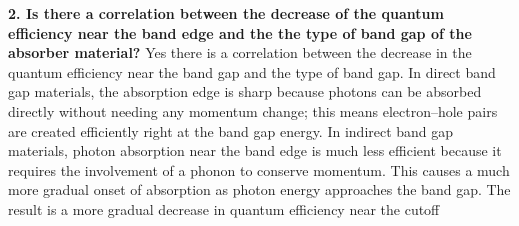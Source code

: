 \textbf{2. Is there a correlation between the decrease of the quantum efficiency near the band edge and the the type of band gap of the absorber material?}
Yes there is a correlation between the decrease in the quantum efficiency near the band gap and the type of band gap.
In direct band gap materials, the absorption edge is sharp because photons can be absorbed directly without needing any momentum change; this means electron–hole pairs are created efficiently right at the band gap energy.
In indirect band gap materials, photon absorption near the band edge is much less efficient because it requires the involvement of a phonon to conserve momentum. This causes a much more gradual onset of absorption as photon energy approaches the band gap.
The result is a more gradual decrease in quantum efficiency near the cutoff